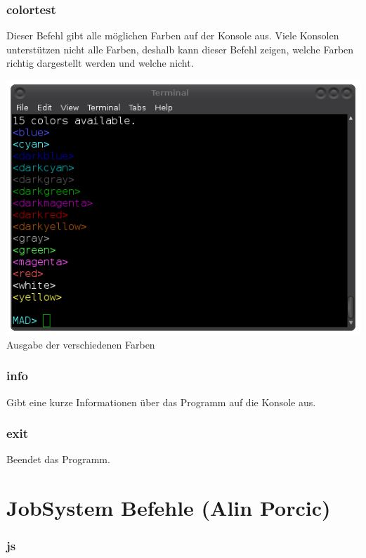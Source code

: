 \documentclass[12pt,a4paper]{report}
\begin{document}
\begin{onehalfspace}
\subsubsection{colortest}

Dieser Befehl gibt alle möglichen Farben auf der Konsole aus. Viele Konsolen unterstützen nicht alle Farben, deshalb kann dieser Befehl zeigen, welche Farben richtig dargestellt werden und welche nicht.

\begin{center}
\includegraphics[scale=0.5]{img/cli_colortest.png}\\
Ausgabe der verschiedenen Farben
\end{center}

\subsubsection{info}

Gibt eine kurze Informationen über das Programm auf die Konsole aus.

\subsubsection{exit}

Beendet das Programm.

\section{JobSystem Befehle (Alin Porcic)}

\subsubsection{js}


\end{onehalfspace}
\end{document}
